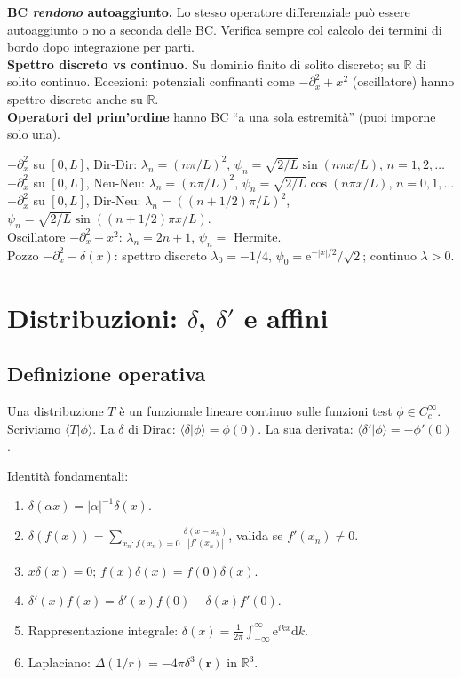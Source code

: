 \documentclass[11pt,a4paper,openany]{book}
\theoremstyle{definition}
\newcommand{\R}{\mathbb{R}}
\newcommand{\braket}[2]{\langle#1|#2\rangle}
\newcommand{\dd}{\mathrm{d}}
\newcommand{\eu}{\mathrm{e}}
\begin{document}
\begin{trucco}
\textbf{BC \emph{rendono} autoaggiunto.} Lo stesso operatore differenziale pu\`o essere autoaggiunto o no a seconda delle BC. Verifica sempre col calcolo dei termini di bordo dopo integrazione per parti.\\
\textbf{Spettro discreto vs continuo.} Su dominio finito di solito discreto; su $\R$ di solito continuo. Eccezioni: potenziali confinanti come $-\partial_x^2+x^2$ (oscillatore) hanno spettro discreto anche su $\R$.\\
\textbf{Operatori del prim'ordine} hanno BC ``a una sola estremit\`a'' (puoi imporne solo una).
\end{trucco}

\begin{formulario}
$-\partial_x^2$ su $[0,L]$, Dir-Dir: $\lambda_n=(n\pi/L)^2$, $\psi_n=\sqrt{2/L}\sin(n\pi x/L)$, $n=1,2,\dots$\\
$-\partial_x^2$ su $[0,L]$, Neu-Neu: $\lambda_n=(n\pi/L)^2$, $\psi_n=\sqrt{2/L}\cos(n\pi x/L)$, $n=0,1,\dots$\\
$-\partial_x^2$ su $[0,L]$, Dir-Neu: $\lambda_n=((n+1/2)\pi/L)^2$, $\psi_n=\sqrt{2/L}\sin((n+1/2)\pi x/L)$.\\
Oscillatore $-\partial_x^2+x^2$: $\lambda_n=2n+1$, $\psi_n=$ Hermite.
\\Pozzo $-\partial_x^2-\delta(x)$: spettro discreto $\lambda_0=-1/4$, $\psi_0=\eu^{-|x|/2}/\sqrt 2$; continuo $\lambda>0$.
\end{formulario}

\chapter{Distribuzioni: $\delta$, $\delta'$ e affini}

\section{Definizione operativa}

\begin{teoria}
Una distribuzione $T$ \`e un funzionale lineare continuo sulle funzioni test $\phi\in C^\infty_c$. Scriviamo $\braket{T}{\phi}$. La $\delta$ di Dirac: $\braket{\delta}{\phi}=\phi(0)$. La sua derivata: $\braket{\delta'}{\phi}=-\phi'(0)$.

Identit\`a fondamentali:
\begin{enumerate}
\item $\delta(\alpha x)=|\alpha|^{-1}\delta(x)$.
\item $\delta(f(x))=\sum_{x_n:f(x_n)=0}\frac{\delta(x-x_n)}{|f'(x_n)|}$, valida se $f'(x_n)\neq 0$.
\item $x\delta(x)=0$; $f(x)\delta(x)=f(0)\delta(x)$.
\item $\delta'(x)f(x)=\delta'(x)f(0)-\delta(x)f'(0)$.
\item Rappresentazione integrale: $\delta(x)=\frac{1}{2\pi}\int_{-\infty}^\infty\eu^{ikx}\dd k$.
\item Laplaciano: $\Delta(1/r)=-4\pi\delta^3(\bm r)$ in $\R^3$.
\end{enumerate}
\end{teoria}
\end{document}

